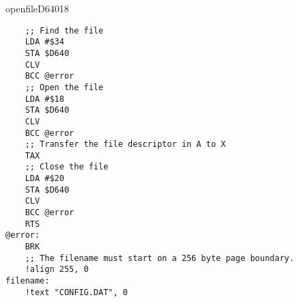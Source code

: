 \begin{hyppotrap}{openfile}{D640}{18}
\begin{tcolorbox}[colback=black,coltext=white]
\verbatimfont{\codefont}
\begin{verbatim}
    ;; Find the file
    LDA #$34
    STA $D640
    CLV
    BCC @error
    ;; Open the file
    LDA #$18
    STA $D640
    CLV
    BCC @error
    ;; Transfer the file descriptor in A to X
    TAX
    ;; Close the file
    LDA #$20
    STA $D640
    CLV
    BCC @error
    RTS
@error:
    BRK
    ;; The filename must start on a 256 byte page boundary.
    !align 255, 0
filename:
    !text "CONFIG.DAT", 0
\end{verbatim}
\end{tcolorbox}
\end{hyppotrap}


\newpage
